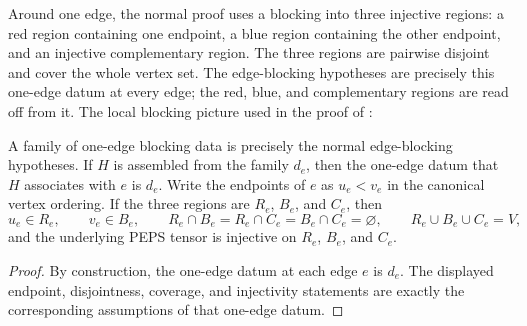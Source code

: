 \begin{definition}%
    \label{def:peps_normalEdgeBlockingHypotheses}
    \leanok
    Around one edge, the normal proof uses a blocking into three injective
    regions: a red region containing one endpoint, a blue region containing the
    other endpoint, and an injective complementary region. The three regions
    are pairwise disjoint and cover the whole vertex set. The edge-blocking
    hypotheses are precisely this one-edge datum at every edge; the red,
    blue, and complementary regions are read off from it. The local blocking
    picture used in the proof of
    \cite[Theorem~3]{Molnar2018NormalPEPS}:
    \begin{center}
        \TNPEPSNormalEdgeBlockingHypotheses
    \end{center}
\end{definition}

\begin{theorem}%
    \label{thm:peps_normalEdgeBlockingHypotheses_injectiveChain}
    \leanok
    A family of one-edge blocking data is precisely the normal edge-blocking
    hypotheses. If $H$ is assembled from the family $d_e$, then the one-edge
    datum that $H$ associates with $e$ is $d_e$. Write the endpoints of $e$
    as $u_e<v_e$ in the canonical vertex ordering. If the three regions are
    $R_e$, $B_e$, and $C_e$, then
    \[
        u_e \in R_e,\qquad v_e \in B_e,\qquad
        R_e\cap B_e=R_e\cap C_e=B_e\cap C_e=\varnothing,\qquad
        R_e\cup B_e\cup C_e=V,
    \]
    and the underlying PEPS tensor is injective on $R_e$, $B_e$, and $C_e$.
\end{theorem}
\begin{proof}\leanok
    By construction, the one-edge datum at each edge $e$ is $d_e$.
    The displayed endpoint, disjointness, coverage, and injectivity statements
    are exactly the corresponding assumptions of that one-edge datum.
\end{proof}

